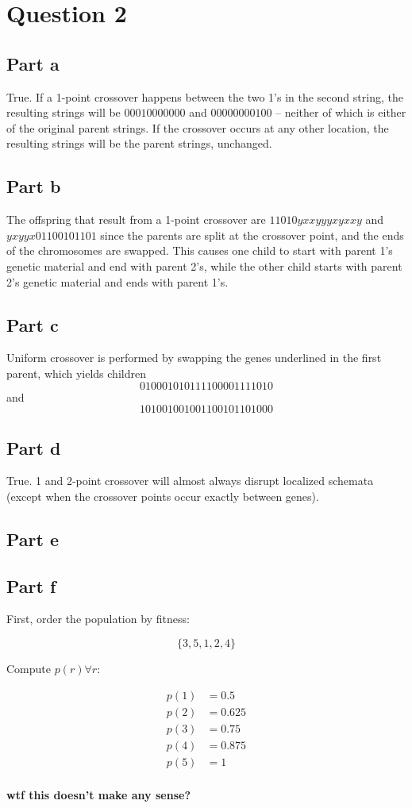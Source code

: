 \documentclass[a4paper]{article}
\begin{document}
\section{Question 2}
\subsection{Part a}
True. If a 1-point crossover happens between the two 1's in the second string,
the resulting strings will be $00010000000$ and $00000000100$ -- neither of
which is either of the original parent strings. If the crossover occurs at any
other location, the resulting strings will be the parent strings, unchanged.

\subsection{Part b}
The offspring that result from a 1-point crossover are $11010yxxyyyxyxxy$ and
$yxyyx01100101101$ since the parents are split at the crossover point, and the
ends of the chromosomes are swapped.  This causes one child to start with
parent 1's genetic material and end with parent 2's, while the other child
starts with parent 2's genetic material and ends with parent 1's.

\subsection{Part c}
Uniform crossover is performed by swapping the genes underlined in the first
parent, which yields children $$01000101 01111000 01111010$$ and $$10100100
10011001 01101000$$

\subsection{Part d}
True. 1 and 2-point crossover will almost always disrupt localized schemata
(except when the crossover points occur exactly between genes).

\subsection{Part e}

\subsection{Part f}
First, order the population by fitness:

$$\{3, 5, 1, 2, 4\}$$

Compute $p(r) \forall r$:

\begin{align*}
    p(1) &= 0.5 \\
    p(2) &= 0.625 \\
    p(3) &= 0.75 \\
    p(4) &= 0.875 \\
    p(5) &= 1 \\
\end{align*}

\textbf{wtf this doesn't make any sense?}
\end{document}
